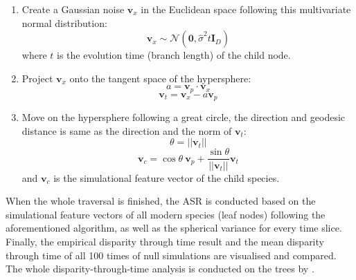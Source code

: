 

\begin{enumerate}
    \item Create a Gaussian noise $\mathbf{v}_{x}$ in the Euclidean space following this multivariate normal distribution:
    \begin{equation}
        \mathbf{v}_{x} \sim \mathcal{N}(\mathbf{0}, \hat{\sigma}^2 t \mathbf{I}_D)
    \end{equation}
    where $t$ is the evolution time (branch length) of the child node.
    \item Project $\mathbf{v}_{x}$ onto the tangent space of the hypersphere:
    \begin{equation}
        a = \mathbf{v}_{p} \cdot \mathbf{v}_{x}
    \end{equation}
    \begin{equation}
        \mathbf{v}_{t} = \mathbf{v}_{x} - a \mathbf{v}_{p}
    \end{equation}
    \item Move on the hypersphere following a great circle, the direction and geodesic distance is same as the direction and the norm of $\mathbf{v}_{t}$:
    \begin{equation}
        \theta = ||\mathbf{v}_{t}||
    \end{equation}
    \begin{equation}
        \mathbf{v}_{c} = \cos{\theta}~\mathbf{v}_{p} + \frac{\sin{\theta}}{||\mathbf{v}_{t}||} \mathbf{v}_{t}
    \end{equation}
    and $\mathbf{v}_{c}$ is the simulational feature vector of the child species.
\end{enumerate}

When the whole traversal is finished, the ASR is conducted based on the simulational
feature vectors of all modern species (leaf nodes) following the aforementioned algorithm,
as well as the spherical variance for every time slice. Finally, the empirical disparity
through time result and the mean disparity through time of all 100 times of null simulations
are visualised and compared. The whole disparity-through-time analysis is conducted on the trees
by \textcite{Stiller2024Complexity}.